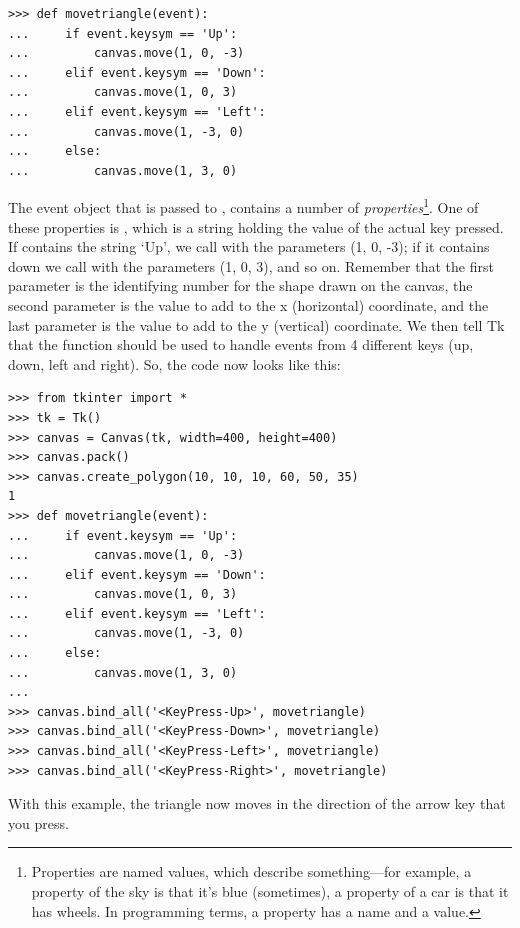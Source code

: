 \begin{listing}
\begin{verbatim}
>>> def movetriangle(event):
...     if event.keysym == 'Up':
...         canvas.move(1, 0, -3)
...     elif event.keysym == 'Down':
...         canvas.move(1, 0, 3)
...     elif event.keysym == 'Left':
...         canvas.move(1, -3, 0)
...     else:
...         canvas.move(1, 3, 0)
\end{verbatim}
\end{listing}

The event object that is passed to , contains a number of \emph{properties}\footnote{Properties are named values, which describe something---for example, a property of the sky is that it's blue (sometimes), a property of a car is that it has wheels. In programming terms, a property has a name and a value.}.  One of these properties is , which is a string holding the value of the actual key pressed.  If  contains the string `Up', we call  with the parameters (1, 0, -3); if it contains down we call with the parameters (1, 0, 3), and so on.  Remember that the first parameter is the identifying number for the shape drawn on the canvas, the second parameter is the value to add to the x (horizontal) coordinate, and the last parameter is the value to add to the y (vertical) coordinate. We then tell Tk that the  function should be used to handle events from 4 different keys (up, down, left and right).  So, the code now looks like this:

\begin{listing}
\begin{verbatim}
>>> from tkinter import *
>>> tk = Tk()
>>> canvas = Canvas(tk, width=400, height=400)
>>> canvas.pack()
>>> canvas.create_polygon(10, 10, 10, 60, 50, 35)
1 
>>> def movetriangle(event):
...     if event.keysym == 'Up':
...         canvas.move(1, 0, -3)
...     elif event.keysym == 'Down':
...         canvas.move(1, 0, 3)
...     elif event.keysym == 'Left':
...         canvas.move(1, -3, 0)
...     else:
...         canvas.move(1, 3, 0)
... 
>>> canvas.bind_all('<KeyPress-Up>', movetriangle)
>>> canvas.bind_all('<KeyPress-Down>', movetriangle)
>>> canvas.bind_all('<KeyPress-Left>', movetriangle)
>>> canvas.bind_all('<KeyPress-Right>', movetriangle)
\end{verbatim}
\end{listing}

\noindent
With this example, the triangle now moves in the direction of the arrow key that you press.

\newpage